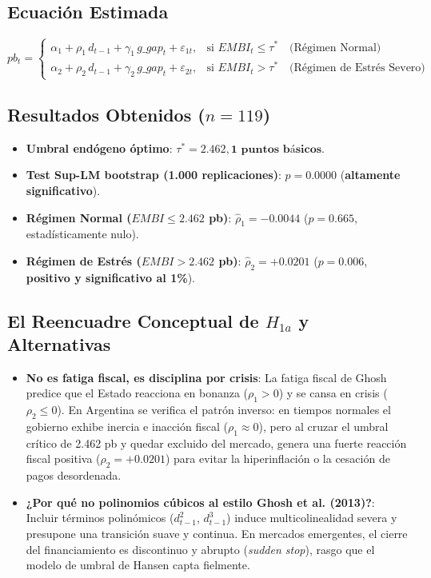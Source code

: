 \documentclass[11pt,a4paper]{article}
\begin{document}
\subsection{Ecuación Estimada}
\begin{equation}
pb_t = \begin{cases} 
\alpha_1 + \rho_1 \, d_{t-1} + \gamma_1 \, g\_gap_t + \varepsilon_{1t}, & \text{si } EMBI_t \le \tau^* \quad \text{(Régimen Normal)} \\[0.4em]
\alpha_2 + \rho_2 \, d_{t-1} + \gamma_2 \, g\_gap_t + \varepsilon_{2t}, & \text{si } EMBI_t > \tau^* \quad \text{(Régimen de Estrés Severo)}
\end{cases}
\end{equation}

\subsection{Resultados Obtenidos ($n=119$)}
\begin{itemize}[leftmargin=1.5em]
    \item \textbf{Umbral endógeno óptimo}: $\tau^* = \mathbf{2.462,1\text{ puntos básicos}}$.
    \item \textbf{Test Sup-LM bootstrap (1.000 replicaciones)}: $p = \mathbf{0.0000}$ (\textbf{altamente significativo}).
    \item \textbf{Régimen Normal ($EMBI \le 2.462$ pb)}: $\hat{\rho}_1 = -0.0044$ ($p = 0.665$, estadísticamente nulo).
    \item \textbf{Régimen de Estrés ($EMBI > 2.462$ pb)}: $\hat{\rho}_2 = \mathbf{+0.0201}$ ($p = \mathbf{0.006}$, \textbf{positivo y significativo al 1\%}).
\end{itemize}

\subsection{El Reencuadre Conceptual de $H_{1a}$ y Alternativas}
\begin{itemize}[leftmargin=1.5em]
    \item \textbf{No es fatiga fiscal, es disciplina por crisis}: La fatiga fiscal de Ghosh predice que el Estado reacciona en bonanza ($\rho_1 > 0$) y se cansa en crisis ($\rho_2 \le 0$). En Argentina se verifica el patrón inverso: en tiempos normales el gobierno exhibe inercia e inacción fiscal ($\rho_1 \approx 0$), pero al cruzar el umbral crítico de 2.462 pb y quedar excluido del mercado, genera una fuerte reacción fiscal positiva ($\rho_2 = +0.0201$) para evitar la hiperinflación o la cesación de pagos desordenada.
    \item \textbf{¿Por qué no polinomios cúbicos al estilo Ghosh et al. (2013)?}: Incluir términos polinómicos ($d_{t-1}^2$, $d_{t-1}^3$) induce multicolinealidad severa y presupone una transición suave y continua. En mercados emergentes, el cierre del financiamiento es discontinuo y abrupto (\textit{sudden stop}), rasgo que el modelo de umbral de Hansen capta fielmente.
\end{itemize}
\end{document}
